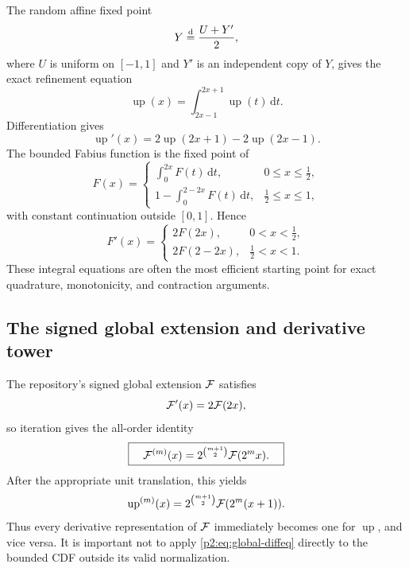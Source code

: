 \documentclass[11pt]{article}
\theoremstyle{definition}
\theoremstyle{remark}
\newcommand{\dd}{\,\mathrm d}
\newcommand{\Up}{\operatorname{up}}
\begin{document}
The random affine fixed point
\begin{equation}
 Y\mathrel{\stackrel{\mathrm d}=}\frac{U+Y'}2,                                    \label{p2:eq:random-fixed}
\end{equation}
where $U$ is uniform on $[-1,1]$ and $Y'$ is an independent copy of $Y$, gives the exact
refinement equation
\begin{equation}
 \boxed{\quad
 \Up(x)=\int_{2x-1}^{2x+1}\Up(t)\dd t.
 \quad}                                                  \label{p2:eq:up-integral-refinement}
\end{equation}
Differentiation gives
\begin{equation}
 \Up'(x)=2\Up(2x+1)-2\Up(2x-1).                         \label{p2:eq:up-differential-refinement}
\end{equation}
The bounded Fabius function is the fixed point of
\begin{equation}
 F(x)=
 \begin{cases}
 \displaystyle\int_0^{2x}F(t)\dd t,&0\le x\le\tfrac12,\\[1ex]
 \displaystyle1-\int_0^{2-2x}F(t)\dd t,&\tfrac12\le x\le1,
 \end{cases}                                            \label{p2:eq:F-fixed}
\end{equation}
with constant continuation outside $[0,1]$.  Hence
\begin{equation}
 F'(x)=
 \begin{cases}
 2F(2x),&0<x<\tfrac12,\\
 2F(2-2x),&\tfrac12<x<1.
 \end{cases}                                            \label{p2:eq:F-diffeq-pieces}
\end{equation}
These integral equations are often the most efficient starting point for exact quadrature,
monotonicity, and contraction arguments.

\subsection{The signed global extension and derivative tower}

The repository's signed global extension $\mathcal F$ satisfies
\begin{equation}
 \mathcal F'(x)=2\mathcal F(2x),                                   \label{p2:eq:global-diffeq}
\end{equation}
so iteration gives the all-order identity
\begin{equation}
 \boxed{\quad
 \mathcal F^{(m)}(x)=2^{\binom{m+1}{2}}\mathcal F(2^m x).
 \quad}                                                  \label{p2:eq:global-derivative-tower}
\end{equation}
After the appropriate unit translation, this yields
\begin{equation}
 \Up^{(m)}(x)=2^{\binom{m+1}{2}}\Fcal(2^m(x+1)).         \label{p2:eq:up-derivative-tower}
\end{equation}
Thus every derivative representation of $\mathcal F$ immediately becomes one for $\Up$, and
vice versa.  It is important not to apply \eqref{p2:eq:global-diffeq} directly to the bounded
CDF outside its valid normalization.
\end{document}
